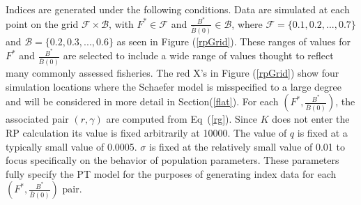 \documentclass[12pt]{article}
\begin{document}
%
Indices are generated under the following conditions. Data are simulated at
each point on the grid $\mathcal{F}\times\mathcal{B}$, with $F^*\in\mathcal{F}$ 
and $\frac{B^*}{\bar B(0)}\in\mathcal{B}$, where $\mathcal{F}=\{0.1, 0.2, ..., 0.7\}$ 
and $\mathcal{B}=\{0.2, 0.3, ..., 0.6\}$ as seen in Figure (\ref{rpGrid}).  
These ranges of values for $F^*$ and $\frac{B^*}{\bar B(0)}$ are selected to 
include a wide range of values thought to reflect many commonly assessed fisheries.
The red X's in Figure (\ref{rpGrid}) show four simulation locations where the 
Schaefer model is misspecified to a large degree and will be considered in more 
detail in \mbox{Section(\ref{flat}).} For each $\left(F^*, \frac{B^*}{\bar B(0)}\right)$, 
the associated pair $(r, \gamma)$ are computed from \mbox{Eq (\ref{rg}).} Since $K$ 
does not enter the RP calculation its value is fixed arbitrarily at 10000.  %
The value of $q$ is fixed at a typically small value of 0.0005. $\sigma$ is 
fixed at the relatively small value of 0.01 to focus specifically on the 
behavior of population parameters. These parameters fully specify the PT 
model for the purposes of generating index data for each $\left(F^*, \frac{B^*}{\bar B(0)}\right)$ pair.
\end{document}
